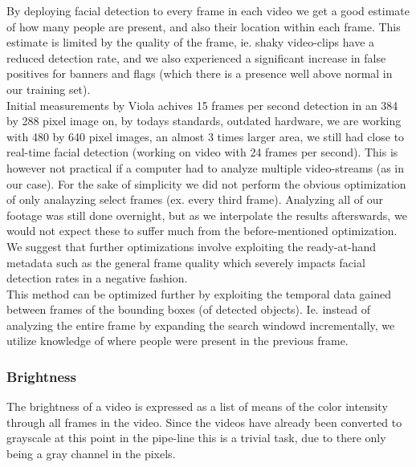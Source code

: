By deploying facial detection to every frame in each video we get a good estimate of how many people are present, and also their location within each frame. This estimate is limited by the quality of the frame, ie. shaky video-clips have a reduced detection rate, and we also experienced a significant increase in false positives for banners and flags (which there is a presence well above normal in our training set).\\
Initial measurements by Viola achives 15 frames per second detection in an 384 by 288 pixel image on, by todays standards, outdated hardware, we are working with 480 by 640 pixel images, an almost 3 times larger area, we still had close to real-time facial detection (working on video with 24 frames per second). This is however not practical if a computer had to analyze multiple video-streams (as in our case). For the sake of simplicity we did not perform the obvious optimization of only analayzing select frames (ex. every third frame). Analyzing all of our footage was still done overnight, but as we interpolate the results afterswards, we would not expect these to suffer much from the before-mentioned optimization.\\
We suggest that further optimizations involve exploiting the ready-at-hand metadata such as the general frame quality which severely impacts facial detection rates in a negative fashion.\\
This method can be optimized further by exploiting the temporal data gained between frames of the bounding boxes (of detected objects). Ie. instead of analyzing the entire frame by expanding the search windowd incrementally, we utilize knowledge of where people were present in the previous frame.
%
\subsubsection{Brightness}
%
The brightness of a video is expressed as a list of means of the color intensity through all frames in the video. Since the videos have already been converted to grayscale at this point in the pipe-line this is a trivial task, due to there only being a gray channel in the pixels.
%
